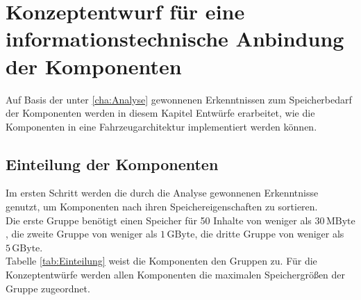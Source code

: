 \chapter{Konzeptentwurf für eine informationstechnische Anbindung der Komponenten} \label{cha:Konzeptentwurf}
Auf Basis der unter \ref{cha:Analyse} gewonnenen Erkenntnissen zum Speicherbedarf der Komponenten werden in diesem Kapitel Entwürfe erarbeitet, wie die Komponenten in eine Fahrzeugarchitektur implementiert werden können.
\section{Einteilung der Komponenten}
Im ersten Schritt werden die durch die Analyse gewonnenen Erkenntnisse genutzt, um Komponenten nach ihren Speichereigenschaften zu sortieren. \\
Die erste Gruppe benötigt einen Speicher für 50 Inhalte von weniger als $ 30\,\mathrm{MByte} $, die zweite Gruppe von weniger als $ 1\,\mathrm{GByte} $, die dritte Gruppe von weniger als $ 5\,\mathrm{GByte} $. \\
Tabelle \ref{tab:Einteilung} weist die Komponenten den Gruppen zu. Für die Konzeptentwürfe werden allen Komponenten die maximalen Speichergrößen der Gruppe zugeordnet. 
\\
